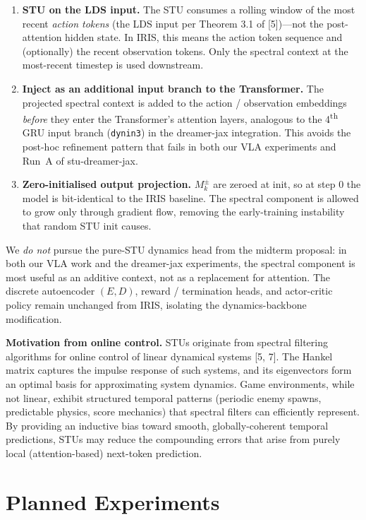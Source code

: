 \documentclass[10pt, letterpaper]{article}
\begin{document}
\begin{enumerate}[leftmargin=1.5em, nosep]
    \item \textbf{STU on the LDS input.} The STU consumes a rolling window of the most recent \emph{action tokens} (the LDS input per Theorem 3.1 of [5])---not the post-attention hidden state. In IRIS, this means the action token sequence and (optionally) the recent observation tokens. Only the spectral context at the most-recent timestep is used downstream.
    \item \textbf{Inject as an additional input branch to the Transformer.} The projected spectral context is added to the action / observation embeddings \emph{before} they enter the Transformer's attention layers, analogous to the 4\textsuperscript{th} GRU input branch (\texttt{dynin3}) in the dreamer-jax integration. This avoids the post-hoc refinement pattern that fails in both our VLA experiments and Run~A of stu-dreamer-jax.
    \item \textbf{Zero-initialised output projection.} $M_k^\pm$ are zeroed at init, so at step 0 the model is bit-identical to the IRIS baseline. The spectral component is allowed to grow only through gradient flow, removing the early-training instability that random STU init causes.
\end{enumerate}

We \emph{do not} pursue the pure-STU dynamics head from the midterm proposal: in both our VLA work and the dreamer-jax experiments, the spectral component is most useful as an additive context, not as a replacement for attention. The discrete autoencoder $(E, D)$, reward / termination heads, and actor-critic policy remain unchanged from IRIS, isolating the dynamics-backbone modification.

\textbf{Motivation from online control.}
STUs originate from spectral filtering algorithms for online control of linear dynamical systems [5, 7]. The Hankel matrix captures the impulse response of such systems, and its eigenvectors form an optimal basis for approximating system dynamics. Game environments, while not linear, exhibit structured temporal patterns (periodic enemy spawns, predictable physics, score mechanics) that spectral filters can efficiently represent. By providing an inductive bias toward smooth, globally-coherent temporal predictions, STUs may reduce the compounding errors that arise from purely local (attention-based) next-token prediction.

\section*{Planned Experiments}
\end{document}
